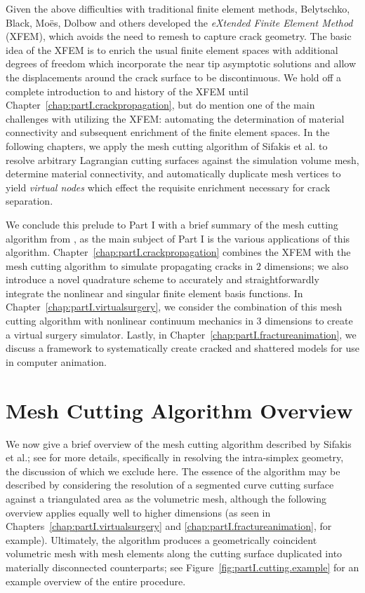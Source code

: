 Given the above difficulties with traditional finite element methods, Belytschko, Black, Mo\"{e}s, Dolbow \cite{Belytschko99, Moes99} and others developed the \emph{eXtended Finite Element Method} (XFEM), which avoids the need to remesh to capture crack geometry. The basic idea of the XFEM is to enrich the usual finite element spaces with additional degrees of freedom which incorporate the near tip asymptotic solutions and allow the displacements around the crack surface to be discontinuous. We hold off a complete introduction to and history of the XFEM until Chapter~\ref{chap:partI.crackpropagation}, but do mention one of the main challenges with utilizing the XFEM: automating the determination of material connectivity and subsequent enrichment of the finite element spaces. In the following chapters, we apply the mesh cutting algorithm of Sifakis et al. \cite{Sifakis07} to resolve arbitrary Lagrangian cutting surfaces against the simulation volume mesh, determine material connectivity, and automatically duplicate mesh vertices to yield \emph{virtual nodes} which effect the requisite enrichment necessary for crack separation.

We conclude this prelude to Part I with a brief summary of the mesh cutting algorithm from \cite{Sifakis07}, as the main subject of Part I is the various applications of this algorithm. Chapter~\ref{chap:partI.crackpropagation} combines the XFEM with the mesh cutting algorithm to simulate propagating cracks in $2$ dimensions; we also introduce a novel quadrature scheme to accurately and straightforwardly integrate the nonlinear and singular finite element basis functions. In Chapter~\ref{chap:partI.virtualsurgery}, we consider the combination of this mesh cutting algorithm with nonlinear continuum mechanics in $3$ dimensions to create a virtual surgery simulator. Lastly, in Chapter~\ref{chap:partI.fractureanimation}, we discuss a framework to systematically create cracked and shattered models for use in computer animation.

\section*{Mesh Cutting Algorithm Overview}

We now give a brief overview of the mesh cutting algorithm described by Sifakis et al.; see \cite{Sifakis07} for more details, specifically in resolving the intra-simplex geometry, the discussion of which we exclude here. The essence of the algorithm may be described by considering the resolution of a segmented curve cutting surface against a triangulated area as the volumetric mesh, although the following overview applies equally well to higher dimensions (as seen in Chapters~\ref{chap:partI.virtualsurgery} and \ref{chap:partI.fractureanimation}, for example). Ultimately, the algorithm produces a geometrically coincident volumetric mesh with mesh elements along the cutting surface duplicated into materially disconnected counterparts; see Figure~\ref{fig:partI.cutting.example} for an example overview of the entire procedure.

